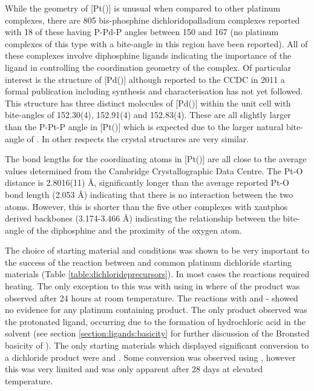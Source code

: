 While the geometry of [Pt(\tButhixantphos)] is unusual when compared to other platinum complexes, there are 805 bis-phosphine dichloridopalladium complexes reported with 18 of these having P-Pd-P angles between 150 and 167\degrees{} (no platinum complexes of this type with a bite-angle in this region have been reported).  All of these complexes involve diphosphine ligands indicating the importance of the ligand in controlling the coordination geometry of the complex.  Of particular interest is the structure of [Pd(\tBuxantphos)] although reported to the \gls{CCDC} in 2011 a formal publication including synthesis and characterisation has not yet followed.  This structure has three distinct molecules of [Pd(\tBuxantphos)] within the unit cell with bite-angles of 152.30(4), 152.91(4) and 152.83(4)\degrees.  These are all slightly larger than the P-Pt-P angle in [Pt(\tButhixantphos)] which is expected due to the larger natural bite-angle of \tBuxantphos{}.  In other respects the crystal structures are very similar.  

The bond lengths for the coordinating atoms in [Pt(\tButhixantphos)] are all close to the average values determined from the Cambridge Crystallographic Data Centre.  The Pt-O distance is 2.8016(11) \si{\angstrom}, significantly longer than the average reported Pt-O bond length (2.053 \si{\angstrom}) indicating that there is no interaction between the two atoms.  However, this is shorter than the five other complexes with xantphos derived backbones (3.174-3.466 \si{\angstrom}) indicating the relationship between the bite-angle of the diphosphine and the proximity of the oxygen atom.  

The choice of starting material and conditions was shown to be very important to the success of the reaction between \tButhixantphos{} and common platinum dichloride starting materials (Table \ref{table:dichlorideprecursors}).  In most cases the reactions required heating.  The only exception to this was with using \ce{[Pt(1,5-hexadiene)Cl2]} in  where  of the product was observed after 24 hours at room temperature.  The reactions with \cis{} and \trans{}-\ce{[Pt(MeCN)2Cl2]} showed no evidence for any platinum containing product.  The only product observed was the protonated \tButhixantphos{} ligand, occurring due to the formation of hydrochloric acid in the solvent (see section \ref{section:ligands:basicity} for further discussion of the Bronsted basicity of \tButhixantphos).  The only starting materials which displayed significant conversion to a dichloride product were \trans\ce{[Pt(tBuCN)2Cl2]} and \ce{[Pt(1,5-hexadiene)Cl2]}.  Some conversion was observed using \ce{[Pt(SEt2)2Cl2]}, however this was very limited and was only apparent after 28 days at elevated temperature.  

